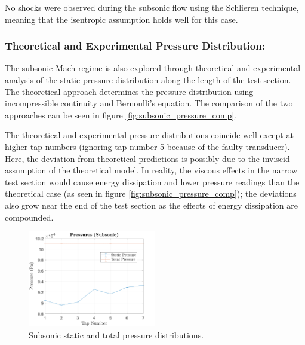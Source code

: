 \documentclass[runningheads]{llncs}
\begin{document}
\noindent
No shocks were observed during the subsonic flow using the Schlieren technique, meaning that the isentropic assumption holds well for this case.\newline

\noindent
\subsubsection{Theoretical and Experimental Pressure Distribution:}
The subsonic Mach regime is also explored through theoretical and experimental analysis of the static pressure distribution along the length of the test section. The theoretical approach determines the pressure distribution using incompressible continuity and Bernoulli's equation. The comparison of the two approaches can be seen in figure \ref{fig:subsonic_pressure_comp}.\newline

\noindent
The theoretical and experimental pressure distributions coincide well except at higher tap numbers (ignoring tap number 5 because of the faulty transducer). Here, the deviation from theoretical predictions is possibly due to the inviscid assumption of the theoretical model. In reality, the viscous effects in the narrow test section would cause energy dissipation and lower pressure readings than the theoretical case (as seen in figure \ref{fig:subsonic_pressure_comp}); the deviations also grow near the end of the test section as the effects of energy dissipation are compounded.

\begin{figure}[h]
    \centering
    \includegraphics[width=0.5\textwidth]{figures/subsonic_pressure_distributions.png}
    \caption{Subsonic static and total pressure distributions.}
    \label{fig:subsonic_pressure}
\end{figure}
\end{document}
